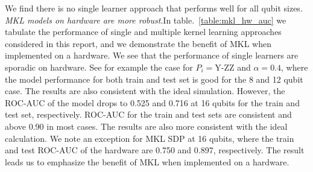 \documentclass[reprint,amsfonts, amssymb, amsmath,  showkeys, nofootinbib,pra, superscriptaddress, twocolumn,longbibliography]{revtex4-2}
\begin{document}
We find there is no single learner approach that performs well for all qubit sizes.
\textit{MKL models on hardware are more robust}.In table.~\ref{table:mkl_hw_auc} we tabulate the performance of single and multiple kernel learning approaches considered in this report, and we demonstrate the benefit of MKL when implemented on a hardware.
We see that the performance of single learners are sporadic on hardware. See for example the case for $P_i=$Y-ZZ and $\alpha=0.4$, where the model performance for both train and test set is good for the 8 and 12 qubit case. The results are also consistent with the ideal simulation. However, the ROC-AUC of the model drops to 0.525 and 0.716 at 16 qubits for the train and test set, respectively.  ROC-AUC for the train and test sets are consistent and above $0.90$ in most cases. The results are also more consistent with the ideal calculation. We note an exception for MKL SDP at 16 qubits, where the train and test ROC-AUC of the hardware are 0.750 and 0.897, respectively.
The result leads us to emphasize the benefit of MKL when implemented on a hardware.
\end{document}
